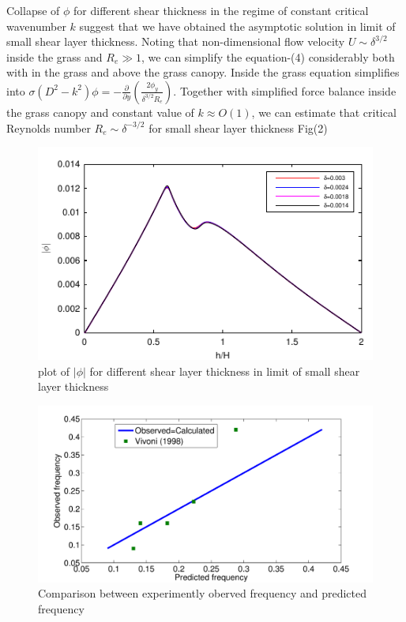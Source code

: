 \documentclass[aps,twocolumn,floatfix,prl,10pt]{revtex4-1}
\newcommand{\del}{\partial}
\begin{document}
Collapse of $\phi$ for different shear thickness in the regime of constant critical wavenumber $k$ suggest that we have obtained the asymptotic solution in limit of small shear layer 
thickness. Noting that non-dimensional flow velocity $U \sim \delta^{3/2}$ inside the grass and $R_{e} \gg 1$, we can simplify the equation-(4) considerably both with in the grass and 
above the grass canopy. Inside the grass equation simplifies into $\sigma\left(D^2-k^2\right)\phi = -\frac{\del}{\del y}\left(\frac{2\phi_y}{\delta^{3/2}R_e}\right)$. Together with simplified
force balance inside the grass canopy and constant value of $k\approx O(1)$, we can estimate that critical Reynolds number $R_e \sim \delta^{-3/2}$ for small shear layer thickness Fig(2) 
\begin{figure}[htb!]
 \includegraphics[]{Asymptotic_eig_set3}
\caption{plot of $|\phi|$ for different shear layer thickness in limit of small shear layer thickness}
\end{figure}

\begin{figure}[htb!]
\includegraphics[scale=0.34]{Observed_vs_calculated}
\caption{Comparison between experimently oberved frequency and predicted frequency}
\end{figure}
\end{document}
